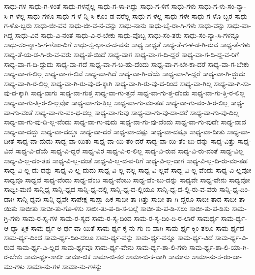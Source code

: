 {ಸಾಧು-ಗಳ
ಸಾಧು-ಗ-ಳಂತೆ
ಸಾಧು-ಗಳನ್ನೆಲ್ಲ
ಸಾಧು-ಗ-ಳಾ-ಗಿದ್ದು
ಸಾಧು-ಗ-ಳಿಗೆ
ಸಾಧು-ಗಳು
ಸಾಧು-ಗ-ಳು-ಸಂ-ನ್ಯಾ-ಸಿ-ಗ-ಳೆಲ್ಲ
ಸಾಧು-ಗಳೂ
ಸಾಧು-ಗ-ಳೆ-ನ್ನಿ-ಸಿ-ಕೊಂ-ಡ-ವರೆಲ್ಲ
ಸಾಧು-ಗ-ಳೆಲ್ಲ
ಸಾಧು-ಗಳೇ
ಸಾಧು-ಗ-ಳೊ-ಬ್ಬರ
ಸಾಧು-ಗ-ಳೊ-ಬ್ಬರು
ಸಾಧು-ಜೀ-ವನ
ಸಾಧು-ಜೀ-ವ-ನ-ವನ್ನು
ಸಾಧು-ನಾನು
ಸಾಧು-ಬೈ-ರಾ-ಗಿ-ಗಳು
ಸಾಧು-ವನ್ನು
ಸಾಧು-ವಾ-ಗಿದ್ದ
ಸಾಧು-ವಿನ
ಸಾಧು-ವಿ-ನಂತೆ
ಸಾಧು-ವಿ-ರ-ಬೇಕು
ಸಾಧು-ವೊಬ್ಬ
ಸಾಧು-ಸಂ-ತರು
ಸಾಧು-ಸಂ-ನ್ಯಾ-ಸಿ-ಗಳನ್ನೂ
ಸಾಧು-ಸಂ-ನ್ಯಾ-ಸಿ-ಗ-ಳೊಂ-ದಿಗೆ
ಸಾಧು-ಸ್ವ-ಭಾ-ವ-ದ-ವನು
ಸಾಧ್ಯ
ಸಾಧ್ಯತೆ
ಸಾಧ್ಯ-ತೆ-ಗ-ಳ-ಡ-ಗಿ-ರುವ
ಸಾಧ್ಯ-ತೆ-ಗಳು
ಸಾಧ್ಯ-ತೆ-ಯ-ಡ-ಗಿ-ರು-ವ-ವರು
ಸಾಧ್ಯ-ತೆ-ಯಿದೆ
ಸಾಧ್ಯ-ವಾಗ
ಸಾಧ್ಯ-ವಾ-ಗ-ದಿ-ದ್ದರೆ
ಸಾಧ್ಯ-ವಾ-ಗ-ದಿ-ದ್ದ-ವ-ರಿಗೆ
ಸಾಧ್ಯ-ವಾ-ಗ-ದಿ-ದ್ದುದು
ಸಾಧ್ಯ-ವಾ-ಗದೆ
ಸಾಧ್ಯ-ವಾ-ಗ-ಬ-ಹು-ದೆಂದು
ಸಾಧ್ಯ-ವಾ-ಗ-ಬೇ-ಕಾ-ದರೆ
ಸಾಧ್ಯ-ವಾ-ಗ-ಬೇಕು
ಸಾಧ್ಯ-ವಾ-ಗ-ಲಿಲ್ಲ
ಸಾಧ್ಯ-ವಾ-ಗ-ಲಿವೆ
ಸಾಧ್ಯ-ವಾ-ಗಿದೆ
ಸಾಧ್ಯ-ವಾ-ಗಿ-ದೆಯೆ
ಸಾಧ್ಯ-ವಾ-ಗಿ-ದ್ದರೆ
ಸಾಧ್ಯ-ವಾ-ಗಿ-ದ್ದುದು
ಸಾಧ್ಯ-ವಾ-ಗಿ-ರ-ಲಿಲ್ಲ
ಸಾಧ್ಯ-ವಾ-ಗಿ-ರು-ವು-ದ-ಕ್ಕಾಗಿ
ಸಾಧ್ಯ-ವಾ-ಗಿ-ರು-ವು-ದ-ರಿಂದ
ಸಾಧ್ಯ-ವಾ-ಗಿಲ್ಲ
ಸಾಧ್ಯ-ವಾ-ಗಿ-ಸು-ವು-ದ-ಕ್ಕಾಗಿ
ಸಾಧ್ಯ-ವಾಗು
ಸಾಧ್ಯ-ವಾ-ಗುತ್ತ
ಸಾಧ್ಯ-ವಾ-ಗು-ತ್ತದೆ
ಸಾಧ್ಯ-ವಾ-ಗು-ತ್ತ-ದೆಂದು
ಸಾಧ್ಯ-ವಾ-ಗು-ತ್ತಿ-ರ-ಲಿಲ್ಲ
ಸಾಧ್ಯ-ವಾ-ಗು-ತ್ತಿ-ರ-ಲಿ-ಲ್ಲವೋ
ಸಾಧ್ಯ-ವಾ-ಗು-ತ್ತಿಲ್ಲ
ಸಾಧ್ಯ-ವಾ-ಗು-ವಂ-ತಹ
ಸಾಧ್ಯ-ವಾ-ಗು-ವಂ-ತಿ-ರ-ಲಿಲ್ಲ
ಸಾಧ್ಯ-ವಾ-ಗು-ವಂತೆ
ಸಾಧ್ಯ-ವಾ-ಗು-ವಂ-ಥ-ದಲ್ಲ
ಸಾಧ್ಯ-ವಾ-ಗುವು
ಸಾಧ್ಯ-ವಾ-ಗು-ವು-ದಾ-ದರೆ
ಸಾಧ್ಯ-ವಾ-ಗು-ವು-ದಿಲ್ಲ
ಸಾಧ್ಯ-ವಾ-ಗು-ವು-ದಿ-ಲ್ಲ-ವೆಂದು
ಸಾಧ್ಯ-ವಾ-ಗು-ವುದು
ಸಾಧ್ಯ-ವಾ-ಗು-ವು-ದೆಂದು
ಸಾಧ್ಯ-ವಾ-ಗು-ವುದೇ
ಸಾಧ್ಯ-ವಾದ
ಸಾಧ್ಯ-ವಾ-ದದ್ದು
ಸಾಧ್ಯ-ವಾ-ದದ್ದೂ
ಸಾಧ್ಯ-ವಾ-ದರೆ
ಸಾಧ್ಯ-ವಾ-ದಷ್ಟು
ಸಾಧ್ಯ-ವಾ-ದಷ್ಟೂ
ಸಾಧ್ಯ-ವಾ-ದೀತು
ಸಾಧ್ಯ-ವಾ-ದೀತೆ
ಸಾಧ್ಯ-ವಾ-ದುದು
ಸಾಧ್ಯ-ವಾ-ಯಿತು
ಸಾಧ್ಯ-ವಾ-ಯಿ-ತೆಂ-ದರೆ
ಸಾಧ್ಯ-ವಾ-ಯಿ-ತೆಂ-ಬು-ದನ್ನು
ಸಾಧ್ಯ-ವಿತ್ತು
ಸಾಧ್ಯ-ವಿದೆ
ಸಾಧ್ಯ-ವಿ-ದೆಯೆ
ಸಾಧ್ಯ-ವಿ-ದ್ದರೆ
ಸಾಧ್ಯ-ವಿರ
ಸಾಧ್ಯ-ವಿ-ರ-ಲಿಲ್ಲ
ಸಾಧ್ಯ-ವಿ-ರುವ
ಸಾಧ್ಯ-ವಿ-ರು-ವಂತೆ
ಸಾಧ್ಯ-ವಿಲ್ಲ
ಸಾಧ್ಯ-ವಿ-ಲ್ಲ-ದಂ-ತಹ
ಸಾಧ್ಯ-ವಿ-ಲ್ಲ-ದಂತೆ
ಸಾಧ್ಯ-ವಿ-ಲ್ಲ-ದ-ವ-ರಿಗೆ
ಸಾಧ್ಯ-ವಿ-ಲ್ಲ-ದಾಗ
ಸಾಧ್ಯ-ವಿ-ಲ್ಲ-ದಿ-ರು-ವಂ-ತಹ
ಸಾಧ್ಯ-ವಿ-ಲ್ಲ-ದು-ದನ್ನು
ಸಾಧ್ಯ-ವಿ-ಲ್ಲ-ದುದು
ಸಾಧ್ಯ-ವಿ-ಲ್ಲ-ವಲ್ಲ
ಸಾಧ್ಯ-ವಿ-ಲ್ಲವೆ
ಸಾಧ್ಯ-ವಿ-ಲ್ಲ-ವೆಂದು
ಸಾಧ್ಯ-ವಿ-ಲ್ಲವೋ
ಸಾಧ್ಯವೂ
ಸಾಧ್ಯವೆ
ಸಾಧ್ಯ-ವೆಂದು
ಸಾಧ್ಯ-ವೆಂಬ
ಸಾಧ್ಯ-ವೆಂಬು
ಸಾಧ್ಯ-ವೆಂ-ಬು-ದನ್ನು
ಸಾಧ್ಯವೇ
ಸಾಧ್ಯ-ವೇನು
ಸಾಧ್ಯವೋ
ಸಾಧ್ವೀ-ಮಣಿ
ಸಾನ್ನಿಧ್ಯ
ಸಾನ್ನಿ-ಧ್ಯದ
ಸಾನ್ನಿ-ಧ್ಯ-ದಲ್ಲಿ
ಸಾನ್ನಿ-ಧ್ಯ-ದ-ಲ್ಲಿಯೂ
ಸಾನ್ನಿ-ಧ್ಯ-ದ-ಲ್ಲಿ-ರು-ವ-ವರು
ಸಾನ್ನಿ-ಧ್ಯ-ದಿಂ-ದಾಗಿ
ಸಾನ್ನಿ-ಧ್ಯವು
ಸಾನ್ನಿ-ಧ್ಯವೇ
ಸಾಪೇಕ್ಷ
ಸಾಪ್ತಾ-ಹಿಕ
ಸಾಬೀ-ತಾ-ಗಿತ್ತು
ಸಾಬೀ-ತಾ-ಗಿ-ದ್ದರೂ
ಸಾಬೀ-ತಾದ
ಸಾಬೀ-ತಾ-ಯಿತು
ಸಾಬೀತು
ಸಾಬೀ-ತು-ಗೊ-ಳಿಸು
ಸಾಬೀ-ತು-ಪ-ಡಿ-ಸ-ಬಲ್ಲೆ
ಸಾಬೀ-ತು-ಪ-ಡಿ-ಸಲು
ಸಾಬೀ-ತು-ಪ-ಡಿಸು
ಸಾಮ-ಗ್ರಿ-ಗಳು
ಸಾಮ-ರ-ಸ್ಯ-ಗಳ
ಸಾಮ-ರ-ಸ್ಯದ
ಸಾಮ-ರ-ಸ್ಯ-ದಿಂದ
ಸಾಮ-ರ-ಸ್ಯ-ದಿಂ-ದಿ-ರ-ಲಾರೆ
ಸಾಮರ್ಥ್ಯ
ಸಾಮ-ರ್ಥ್ಯ-ಆ-ಧ್ಯಾ-ತ್ಮಿಕ
ಸಾಮ-ರ್ಥ್ಯ-ಅ-ರ್ಥ-ವಾ-ಯಿತೆ
ಸಾಮ-ರ್ಥ್ಯ-ಕ್ಕ-ನು-ಗು-ಣ-ವಾಗಿ
ಸಾಮ-ರ್ಥ್ಯ-ಕ್ಕಿಂ-ತಲೂ
ಸಾಮ-ರ್ಥ್ಯದ
ಸಾಮ-ರ್ಥ್ಯ-ದಿಂದ
ಸಾಮ-ರ್ಥ್ಯ-ದಿಂ-ದಲೂ
ಸಾಮ-ರ್ಥ್ಯ-ವನ್ನು
ಸಾಮ-ರ್ಥ್ಯ-ವನ್ನೂ
ಸಾಮ-ರ್ಥ್ಯ-ವಿದೆ
ಸಾಮ-ರ್ಥ್ಯ-ವಿ-ರುವ
ಸಾಮ-ರ್ಥ್ಯ-ವಿ-ಲ್ಲದ
ಸಾಮ-ರ್ಥ್ಯವೂ
ಸಾಮ-ರ್ಥ್ಯ-ವೇನು
ಸಾಮ-ರ್ಥ್ಯ-ಶಾ-ಲಿ-ಗಳು
ಸಾಮ-ರ್ಥ್ಯ-ಶಾ-ಲಿ-ಯಾ-ಗಿ-ರ-ಬೇಕು
ಸಾಮ-ರ್ಥ್ಯ-ಶಾಲೀ
ಸಾಮಾ-ಜಿಕ
ಸಾಮಾ-ಜಿ-ಕರ
ಸಾಮಾ-ಜಿ-ಕ-ವಾಗಿ
ಸಾಮಾನು
ಸಾಮಾ-ನು-ಸ-ರಂ-ಜಾ-ಮು-ಗಳು
ಸಾಮಾ-ನು-ಗಳ
ಸಾಮಾ-ನು-ಗಳನ್ನು
}
